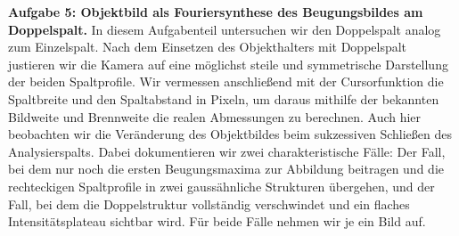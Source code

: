 \textbf{Aufgabe 5: Objektbild als Fouriersynthese des Beugungsbildes am Doppelspalt.} In diesem Aufgabenteil untersuchen wir den Doppelspalt analog zum Einzelspalt. Nach dem Einsetzen des Objekthalters mit Doppelspalt justieren wir die Kamera auf eine möglichst steile und symmetrische Darstellung der beiden Spaltprofile. Wir vermessen anschließend mit der Cursorfunktion die Spaltbreite und den Spaltabstand in Pixeln, um daraus mithilfe der bekannten Bildweite und Brennweite die realen Abmessungen zu berechnen. Auch hier beobachten wir die Veränderung des Objektbildes beim sukzessiven Schließen des Analysierspalts. Dabei dokumentieren wir zwei charakteristische Fälle: Der Fall, bei dem nur noch die ersten Beugungsmaxima zur Abbildung beitragen und die rechteckigen Spaltprofile in zwei gaussähnliche Strukturen übergehen, und der Fall, bei dem die Doppelstruktur vollständig verschwindet und ein flaches Intensitätsplateau sichtbar wird. Für beide Fälle nehmen wir je ein Bild auf.